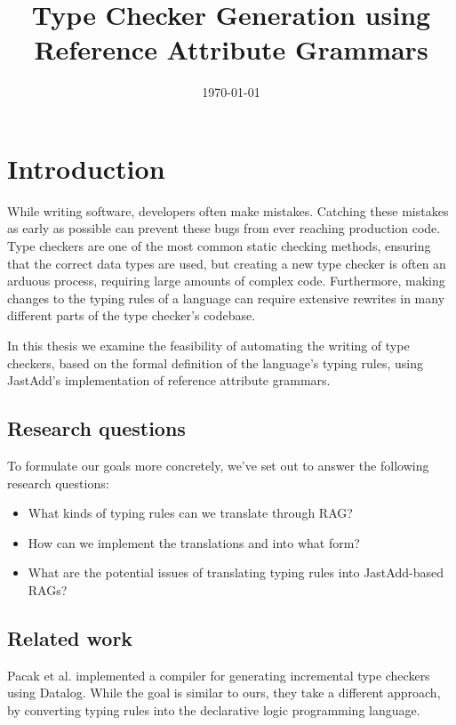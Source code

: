 \documentclass[nofilelist]{cslthse-msc}
\title{Type Checker Generation using Reference Attribute Grammars}
\date{\today}
\begin{document}
\renewcommand{\bibname}{References}

\makefrontmatter
\chapter{Introduction} %
While writing software, developers often make mistakes.
Catching these mistakes as early as possible can prevent these bugs from ever reaching production code.
Type checkers are one of the most common static checking methods, ensuring that the correct data types are used, but creating a new type checker is often an arduous process, requiring large amounts of complex code.
Furthermore, making changes to the typing rules of a language can require extensive rewrites in many different parts of the type checker's codebase.

In this thesis we examine the feasibility of automating the writing of type checkers, based on the formal definition of the language's typing rules, using JastAdd's implementation of reference attribute grammars.


\section{Research questions}
To formulate our goals more concretely, we've set out to answer the following research questions:
\newcommand{\rqone}{What kinds of typing rules can we translate through RAG?}
\newcommand{\rqtwo}{How can we implement the translations and into what form?}
\newcommand{\rqthree}{What are the potential issues of translating typing rules into JastAdd-based RAGs?}
\begin{itemize}
  \item \rqone
  \item \rqtwo
  \item \rqthree
\end{itemize}

\section{Related work} %
Pacak et al. implemented a compiler for generating incremental type checkers using Datalog\cite{Pacak}.
While the goal is similar to ours, they take a different approach, by converting typing rules into the declarative logic programming language.
\end{document}
